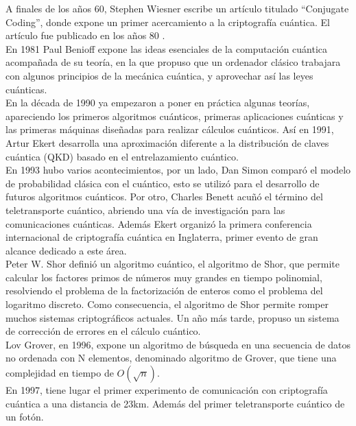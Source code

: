 A finales de los años 60, Stephen Wiesner escribe un artículo titulado ``Conjugate Coding'', donde expone un primer acercamiento a la criptografía cuántica. El artículo fue publicado en los años 80 \cite{computacion-cuantica-crono}.\\

En 1981 Paul Benioff expone las ideas esenciales de la computación cuántica acompañada de su teoría, en la que propuso que un ordenador clásico trabajara con algunos principios de la mecánica cuántica, y aprovechar así las leyes cuánticas.\\


En la década de 1990 ya empezaron a poner en práctica algunas teorías, apareciendo los primeros algoritmos cuánticos, primeras aplicaciones cuánticas y las primeras máquinas diseñadas para realizar cálculos cuánticos. Así en 1991, Artur Ekert desarrolla una aproximación diferente a la distribución de claves cuántica (QKD) basado en el entrelazamiento cuántico.\\

En 1993 hubo varios acontecimientos, por un lado, Dan Simon comparó el modelo de probabilidad clásica con el cuántico, esto se utilizó para el desarrollo de futuros algoritmos cuánticos. Por otro, Charles Benett acuñó el término del teletransporte cuántico, abriendo una vía de investigación para las comunicaciones cuánticas. Además Ekert organizó la primera conferencia internacional de criptografía cuántica en Inglaterra, primer evento de gran alcance dedicado a este área.\\

Peter W. Shor definió un algoritmo cuántico, el algoritmo de Shor, que permite calcular los factores primos de números muy grandes en tiempo polinomial, resolviendo el problema de la factorización de enteros como el problema del logaritmo discreto. Como consecuencia, el algoritmo de Shor permite romper muchos sistemas criptográficos actuales. Un año más tarde, propuso un sistema de corrección de errores en el cálculo cuántico.\\

Lov Grover, en 1996, expone un algoritmo de búsqueda en una secuencia de datos no ordenada con N elementos, denominado algoritmo de Grover, que tiene una complejidad en tiempo de $O(\sqrt{n})$.\\

En 1997, tiene lugar el primer experimento de comunicación con criptografía cuántica a una distancia de 23km. Además del primer teletransporte cuántico de un fotón.\\

